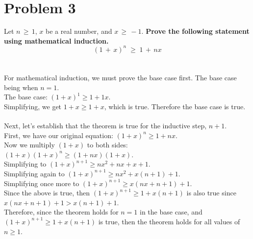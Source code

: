\documentclass{amsart}
\theoremstyle{definition}
\theoremstyle{Exercise}
\theoremstyle{remark}
\theoremstyle{rule}
\numberwithin{equation}{section}
\begin{document}
  \section*{Problem 3}
  Let $n\, \geq \, 1$, $x$ be a real number, and $x\, \geq\,-1$. {\bf Prove the following statement using mathematical induction.}
  \[(1\,+\,x)^n\;\geq\;1\,+\,nx\]
\\\\
  For mathematical induction, we must prove the base case first. The base case being when $n = 1$.\\
  The base case: $(1 + x)^1 \geq 1 + 1x$.\\
  Simplifying, we get $1 + x \geq 1 + x$, which is true. Therefore the base case is true.\\
  \\
  Next, let's establish that the theorem is true for the inductive step, $n + 1$.\\
  First, we have our original equation: $(1 + x)^n \geq 1 + nx$.\\
  Now we multiply $(1 + x)$ to both sides: $(1 + x)(1 + x)^n \geq (1 + nx)(1 + x)$.\\
  Simplifying to $(1 + x)^{n+1} \geq nx^2 + nx + x + 1$.\\
  Simplifying again to $(1 + x)^{n+1} \geq nx^2 + x(n + 1) + 1$.\\
  Simplifying once more to $(1 + x)^{n+1} \geq x(nx + n + 1) + 1$.\\
  Since the above is true, then $(1 + x)^{n+1} \geq 1 + x(n + 1)$ is also true since $x(nx + n + 1) + 1 > x(n + 1) + 1$.\\
  Therefore, since the theorem holds for $n = 1$ in the base case, and $(1 + x)^{n+1} \geq 1 + x(n + 1)$ is true, then the theorem holds for all values of $n \geq 1$.
  
  
\\\\
\newpage
\end{document}

